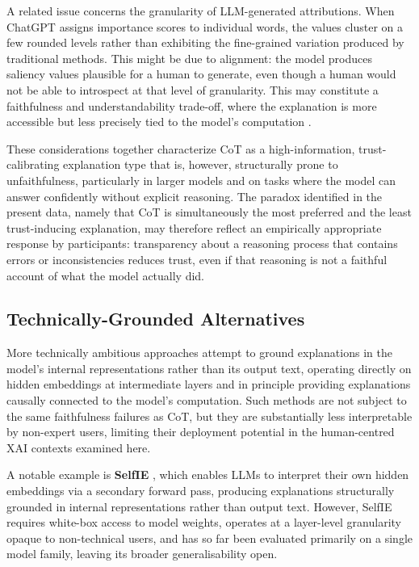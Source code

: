 A related issue concerns the granularity of LLM-generated attributions. When ChatGPT assigns importance scores to individual words, the values cluster on a few rounded levels rather than exhibiting the fine-grained variation produced by traditional methods. This might be due to alignment: the model produces saliency values
plausible for a human to generate, even though a human would not be able to introspect at that level of granularity. This may constitute a faithfulness and understandability trade-off, where the explanation is more accessible but less precisely tied to the model's computation \cite{huang_can_2023}.

These considerations together characterize CoT as a high-information, trust-calibrating explanation type that is, however, structurally prone to unfaithfulness, particularly in larger models and on tasks where the model can answer confidently without explicit reasoning. The paradox identified in the present data,
namely that CoT is simultaneously the most preferred and the least trust-inducing explanation, may therefore reflect an empirically appropriate response by participants: transparency about a reasoning process that contains errors or inconsistencies reduces trust, even if that reasoning is not a faithful account of what the model actually did.

\subsection{Technically-Grounded Alternatives}

More technically ambitious approaches attempt to ground explanations in the model's internal representations rather than its output text, operating directly on hidden embeddings at intermediate layers and in principle providing explanations causally connected to the model's computation. Such methods are not subject to the same faithfulness failures as CoT, but they are substantially less interpretable by non-expert users, limiting their deployment potential in the human-centred XAI contexts examined here.

A notable example is \textbf{SelfIE} \cite{chen_selfie_2024}, which enables LLMs to interpret their own hidden embeddings via a secondary forward pass, producing explanations structurally grounded in internal representations rather than output text. However, SelfIE requires white-box access to model weights, operates at a layer-level granularity opaque to non-technical users, and has so far been evaluated primarily on a single model family, leaving its broader generalisability open.

